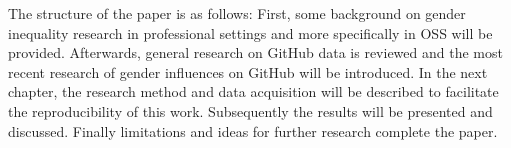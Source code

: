 The structure of the paper is as follows: First, some background on gender inequality research in professional settings and more specifically in \ac{OSS} will be provided. Afterwards, general research on GitHub data is reviewed and the most recent research of gender influences on GitHub will be introduced. In the next chapter, the research method and data acquisition will be described to facilitate the reproducibility of this work. Subsequently the results will be presented and discussed. Finally limitations and ideas for further research complete the paper.





